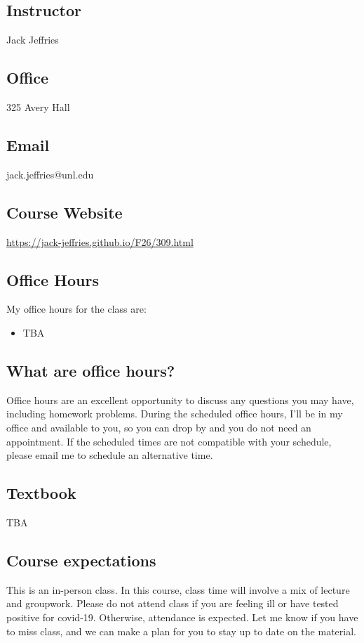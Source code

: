 \documentclass[12pt]{amsart}
\begin{document}
	

	\subsection*{Instructor}  Jack Jeffries
	


	\subsection*{Office}  325 Avery Hall

	\subsection*{Email}   jack.jeffries@unl.edu
	
	\subsection*{Course Website} \href{https://jack-jeffries.github.io/F26/309.html}{https://jack-jeffries.github.io/F26/309.html}

	\subsection*{Office Hours}  My office hours for the class are:
\begin{itemize}
\item TBA 
\end{itemize}

	\subsection*{What are office hours?} 
Office hours are an excellent opportunity to discuss any questions you may have, including homework problems. 
During the scheduled office hours, I'll be in my office and available to you, so you can drop by and you {do not need an appointment}. If the scheduled times are not compatible with your schedule, please email me to schedule an alternative time. 


	\subsection*{Textbook} 
	
	TBA
	
\subsection*{Course expectations} 
This is an { in-person} class.  In this course, class time will involve a mix of lecture and groupwork. 
Please {do not} attend class if you are feeling ill or have tested positive for covid-19. Otherwise, {attendance is expected}. Let me know if you have to miss class, and we can make a plan for you to stay up to date on the material.
\end{document}
